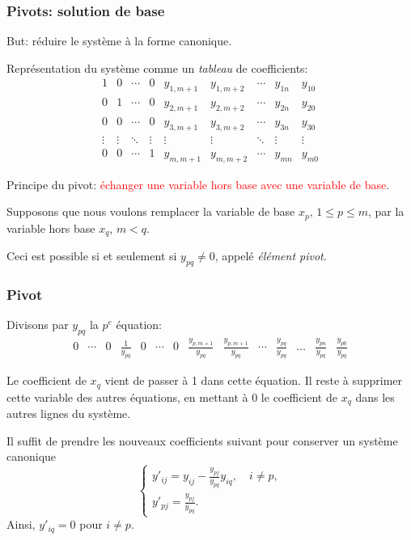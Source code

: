 \documentclass[t,usepdftitle=false]{beamer}
\begin{document}
\begin{frame}
\frametitle{Pivots: solution de base}

{\color{blue}But}: réduire le système à la forme canonique.

\mbox{}

Représentation du système comme un \textit{tableau} de coefficients:
\[
\begin{matrix}
1 & 0 & \cdots & 0 & y_{1,m+1} & y_{1,m+2} & \cdots & y_{1n} & y_{10} \\
0 & 1 & \cdots & 0 & y_{2,m+1} & y_{2,m+2} & \cdots & y_{2n} & y_{20} \\
0 & 0 & \cdots & 0 & y_{3,m+1} & y_{3,m+2} & \cdots & y_{3n} & y_{30} \\
\vdots & \vdots & \ddots & \vdots & \vdots & \vdots & \ddots & \vdots & \vdots \\
0 & 0 & \cdots & 1 & y_{m,m+1} & y_{m,m+2} & \cdots & y_{mn} & y_{m0}
\end{matrix}
\]

\mbox{}

Principe du pivot: \textcolor{red}{échanger une variable hors base avec une variable de base}.

\mbox{}

Supposons que nous voulons remplacer la variable de base $x_p$, $1 \leq p \leq m$, par la variable hors base $x_q$, $m < q$.

\mbox

Ceci est possible si et seulement si $y_{pq} \ne 0$, appelé {\sl élément pivot}.

\end{frame}

\begin{frame}
\frametitle{Pivot}

Divisons par $y_{pq}$ la $p^e$ équation:
\setcounter{MaxMatrixCols}{20}
$$
\begin{matrix}
0 & \cdots & 0 & \frac{1}{y_{pq}} & 0 & \cdots & 0 & \frac{y_{p,m+1}}{y_{pq}} & \frac{y_{p,m+1}}{y_{pq}} & %
\cdots & \frac{y_{pq}}{y_{pq}} & \ldots & \frac{y_{pn}}{y_{pq}} & \frac{y_{p0}}{y_{pq}}
\end{matrix}
$$

\mbox{}

Le coefficient de $x_q$ vient de passer à 1 dans cette équation.
Il reste à supprimer cette variable des autres équations, en mettant à 0 le coefficient de $x_q$ dans les autres lignes du système.

\mbox{}

Il suffit de prendre les nouveaux coefficients suivant pour conserver un système canonique
\[
\begin{cases}
y'_{ij} = y_{ij} 
 - \frac{y_{pj}}{y_{pq}} y_{iq}, \quad i \ne p, \\
 y'_{pj} = \frac{y_{pj}}{y_{pq}}.
 \end{cases}
\]
Ainsi, $y'_{iq} = 0$ pour $i \ne p$.
\end{frame}
\end{document}
